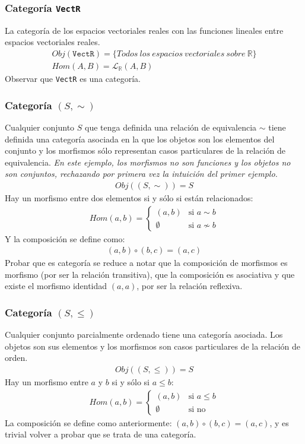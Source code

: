 \documentclass[a4paper, 11pt]{amsart}
\newcommand{\twopartdef}[4]
{
	\left\{
		\begin{array}{ll}
			#1 & \mbox{si } #2 \\
			#3 & \mbox{si } #4
		\end{array}
	\right.
}
\theoremstyle{definition}
\theoremstyle{remark}
\numberwithin{equation}{section}
\begin{document}
    \subsubsection{Categoría \texttt{VectR}}
      La categoría de los espacios vectoriales reales con las funciones lineales entre
      espacios vectoriales reales.
      \begin{gather*}
        Obj(\texttt{VectR}) = \{Todos\ los\ espacios\ vectoriales\ sobre\ \mathbb{R}\} \\
        Hom(A,B)= \mathcal{L}_{\mathbb{R}}(A,B)
      \end{gather*}
      \exca Observar que \texttt{VectR} es una categoría.
    
    \subsubsection{Categoría \texttt{$(S,\sim)$}}
      Cualquier conjunto $S$ que tenga definida una relación de equivalencia $\sim$ tiene
      definida una categoría asociada en la que los objetos son los elementos del conjunto
      y los morfismos sólo representan casos particulares de la relación de equivalencia.
      \textit{En este ejemplo, los morfismos no son funciones y los objetos no son conjuntos,
      rechazando por primera vez la intuición del primer ejemplo.}
      \begin{gather*}
        Obj((S,\sim)) = S
      \end{gather*}
      Hay un morfismo entre dos elementos si y sólo si están relacionados:
      \begin{align*}
        Hom(a,b)= \twopartdef{(a,b)}{a \sim b}{\emptyset}{a \nsim b}
      \end{align*}
      Y la composición se define como:
      \begin{align*}
       (a,b) \circ (b,c) = (a,c)
      \end{align*}
      Probar que es categoría se reduce a notar que la composición de morfismos es morfismo (por
      ser la relación transitiva), que la composición es asociativa y que existe el morfismo identidad
      $(a,a)$, por ser la relación reflexiva.
     
    \subsubsection{Categoría \texttt{$(S,\leq)$}}
      Cualquier conjunto parcialmente ordenado tiene una categoría asociada. Los objetos
      son sus elementos y los morfismos son casos particulares de la relación de orden.
      \begin{gather*}
        Obj((S,\leq)) = S
      \end{gather*}
      Hay un morfismo entre $a$ y $b$ si y sólo si $a \leq b$:
      \begin{align*}
        Hom(a,b)= \twopartdef{(a,b)}{a \leq b}{\emptyset}{\mbox{no}}
      \end{align*}
      La composición se define como anteriormente: $(a,b) \circ (b,c) = (a,c)$, y es
      trivial volver a probar que se trata de una categoría.
      \medskip
      
\end{document}
